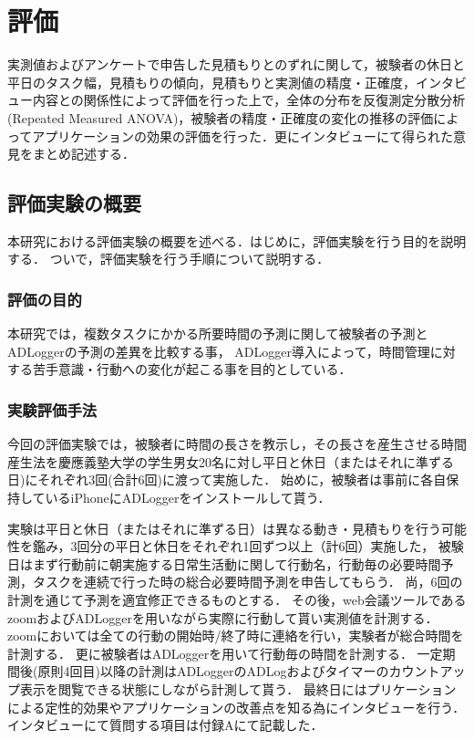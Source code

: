 \chapter{評価}
実測値およびアンケートで申告した見積もりとのずれに関して，被験者の休日と平日のタスク幅，見積もりの傾向，見積もりと実測値の精度・正確度，インタビュー内容との関係性によって評価を行った上で，全体の分布を反復測定分散分析(Repeated Measured ANOVA)，被験者の精度・正確度の変化の推移の評価によってアプリケーションの効果の評価を行った．更にインタビューにて得られた意見をまとめ記述する．

\section{評価実験の概要}
本研究における評価実験の概要を述べる．はじめに，評価実験を行う目的を説明する．
ついで，評価実験を行う手順について説明する．

\subsection{評価の目的}
本研究では，複数タスクにかかる所要時間の予測に関して被験者の予測とADLoggerの予測の差異を比較する事，
ADLogger導入によって，時間管理に対する苦手意識・行動への変化が起こる事を目的としている．

\subsection{実験評価手法}
今回の評価実験では，被験者に時間の長さを教示し，その長さを産生させる時間産生法\cite{Oguro1961}\cite{Tayama2018}を慶應義塾大学の学生男女20名に対し平日と休日（またはそれに準ずる日)にそれぞれ3回(合計6回)に渡って実施した．
始めに，被験者は事前に各自保持しているiPhoneにADLoggerをインストールして貰う．

実験は平日と休日（またはそれに準ずる日）は異なる動き・見積もりを行う可能性を鑑み，3回分の平日と休日をそれぞれ1回ずつ以上（計6回）実施した，
被験日はまず行動前に朝実施する日常生活動に関して行動名，行動毎の必要時間予測，タスクを連続で行った時の総合必要時間予測を申告してもらう．
尚，6回の計測を通じて予測を適宜修正できるものとする．
その後，web会議ツールであるzoom\cite{zoom}およびADLoggerを用いながら実際に行動して貰い実測値を計測する．
zoomにおいては全ての行動の開始時/終了時に連絡を行い，実験者が総合時間を計測する．
更に被験者はADLoggerを用いて行動毎の時間を計測する．
一定期間後(原則4回目)以降の計測はADLoggerのADLogおよびタイマーのカウントアップ表示を閲覧できる状態にしながら計測して貰う．
最終日にはプリケーションによる定性的効果やアプリケーションの改善点を知る為にインタビューを行う．インタビューにて質問する項目は付録Aにて記載した．

